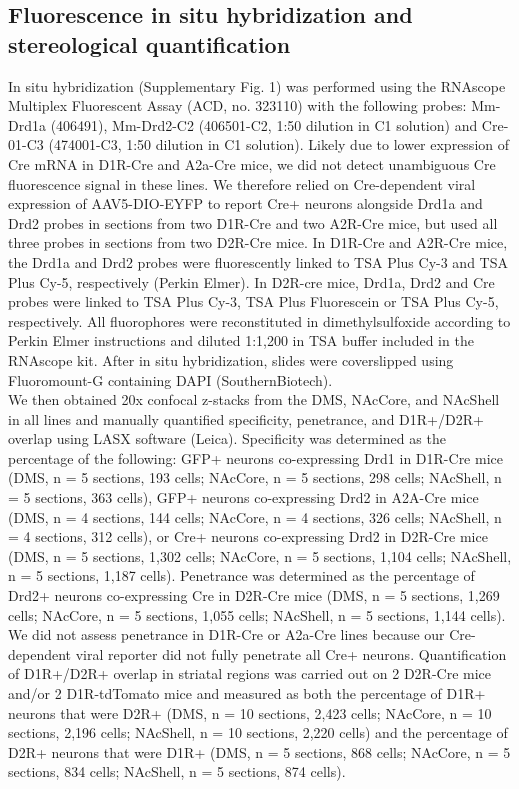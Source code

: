 \subsection{Fluorescence in situ hybridization and stereological quantification}
\label{sec:ap1:m11}
In situ hybridization (Supplementary Fig. 1) was performed using the RNAscope Multiplex Fluorescent Assay (ACD, no. 323110) with the following probes: Mm-Drd1a (406491), Mm-Drd2-C2 (406501-C2, 1:50 dilution in C1 solution) and Cre-01-C3 (474001-C3, 1:50 dilution in C1 solution). Likely due to lower expression of Cre mRNA in D1R-Cre and A2a-Cre mice, we did not detect unambiguous Cre fluorescence signal in these lines. We therefore relied on Cre-dependent viral expression of AAV5-DIO-EYFP to report Cre+ neurons alongside Drd1a and Drd2 probes in sections from two D1R-Cre and two A2R-Cre mice, but used all three probes in sections from two D2R-Cre mice. In D1R-Cre and A2R-Cre mice, the Drd1a and Drd2 probes were fluorescently linked to TSA Plus Cy-3 and TSA Plus Cy-5, respectively (Perkin Elmer). In D2R-cre mice, Drd1a, Drd2 and Cre probes were linked to TSA Plus Cy-3, TSA Plus Fluorescein or TSA Plus Cy-5, respectively. All fluorophores were reconstituted in dimethylsulfoxide according to Perkin Elmer instructions and diluted 1:1,200 in TSA buffer included in the RNAscope kit. After in situ hybridization, slides were coverslipped using Fluoromount-G containing DAPI (SouthernBiotech). \\
We then obtained 20x confocal z-stacks from the DMS, NAcCore, and NAcShell in all lines and manually quantified specificity, penetrance, and D1R+/D2R+ overlap using LASX software (Leica). Specificity was determined as the percentage of the following: GFP+ neurons co-expressing Drd1 in D1R-Cre mice (DMS, n = 5 sections, 193 cells; NAcCore, n = 5 sections, 298 cells; NAcShell, n = 5 sections, 363 cells), GFP+ neurons co-expressing Drd2 in A2A-Cre mice (DMS, n = 4 sections, 144 cells; NAcCore, n = 4 sections, 326 cells; NAcShell, n = 4 sections, 312 cells), or Cre+ neurons co-expressing Drd2 in D2R-Cre mice (DMS, n = 5 sections, 1,302 cells; NAcCore, n = 5 sections, 1,104 cells; NAcShell, n = 5 sections, 1,187 cells). Penetrance was determined as the percentage of Drd2+ neurons co-expressing Cre in D2R-Cre mice (DMS, n = 5 sections, 1,269 cells; NAcCore, n = 5 sections, 1,055 cells; NAcShell, n = 5 sections, 1,144 cells). We did not assess penetrance in D1R-Cre or A2a-Cre lines because our Cre-dependent viral reporter did not fully penetrate all Cre+ neurons. Quantification of D1R+/D2R+ overlap in striatal regions was carried out on 2 D2R-Cre mice and/or 2 D1R-tdTomato mice and measured as both the percentage of D1R+ neurons that were D2R+ (DMS, n = 10 sections, 2,423 cells; NAcCore, n = 10 sections, 2,196 cells; NAcShell, n = 10 sections, 2,220 cells) and the percentage of D2R+ neurons that were D1R+ (DMS, n = 5 sections, 868 cells; NAcCore, n = 5 sections, 834 cells; NAcShell, n = 5 sections, 874 cells).
